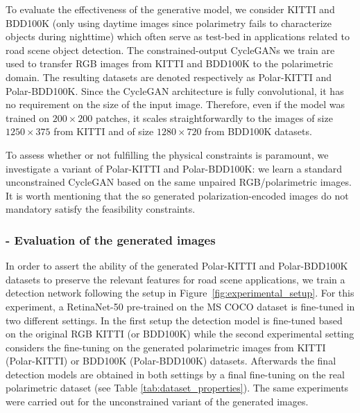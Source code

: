 To evaluate the effectiveness of the generative model, we consider KITTI \citep{Geiger2012} and BDD100K \citep{Yu2020}(only using daytime images since polarimetry fails to characterize objects during nighttime) which often serve as test-bed in applications related to road scene object detection. The constrained-output CycleGANs we train are used to transfer RGB images from KITTI and BDD100K to the polarimetric domain. The resulting datasets are denoted respectively as Polar-KITTI and Polar-BDD100K. Since the CycleGAN architecture is fully convolutional, it has no requirement on the size of the input image. Therefore, even if the model was trained on $200 \times 200$ patches, it scales straightforwardly to the images of size $1250 \times 375$ from KITTI and of size $1280 \times 720$ from BDD100K datasets.

To assess whether or not fulfilling the physical  constraints is paramount, we investigate a variant of Polar-KITTI and Polar-BDD100K: we learn a standard unconstrained CycleGAN based on the same unpaired RGB/polarimetric images. It is worth mentioning that the so generated polarization-encoded images do not mandatory satisfy the feasibility constraints. 

\subsubsection{- Evaluation of the generated images} \label{subsec:eval_gen_img}

In order to assert the ability of the generated Polar-KITTI and Polar-BDD100K datasets to preserve the relevant features for road scene applications, we train a detection network following the setup in Figure~\ref{fig:experimental_setup}. For this experiment, a RetinaNet-50 \citep{Lin2017} pre-trained on the MS COCO dataset \citep{Lin2014} is fine-tuned in two different settings. In the first setup the detection model is fine-tuned based on the original RGB KITTI (or BDD100K) while the second experimental setting considers the fine-tuning on the generated polarimetric images from KITTI (Polar-KITTI) or BDD100K (Polar-BDD100K) datasets. Afterwards the final detection models are obtained in both settings by a final fine-tuning on the real polarimetric dataset (see Table \ref{tab:dataset_properties}). The same experiments were carried out for the unconstrained variant of the generated images.

